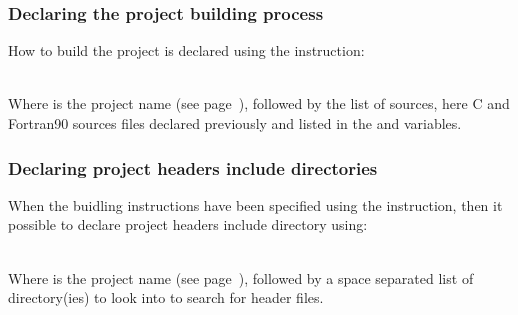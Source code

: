 \newpage
\subsubsection*{Declaring the project building process}

How to build the project is declared using the  instruction:
\begin{script}
\end{script}
\\[-0.25cm]
\noindent Where  is the project name (see page~\pageref{cmake_pname}), followed by the list of sources, here C and Fortran90 sources files declared previously and listed in the  and  variables. 

\subsubsection*{Declaring project headers include directories}

When the buidling instructions have been specified using the  instruction, then it possible to declare project headers include directory using: 
\begin{script}
\end{script} \\[-0.5cm]
\noindent Where  is the project name (see page~\pageref{cmake_pname}), followed by a space separated list of directory(ies) to look into to search for header files. 

